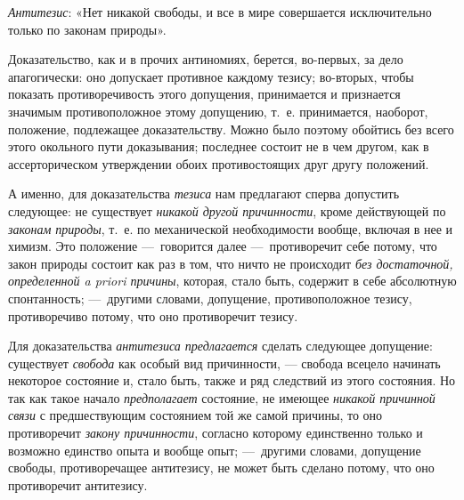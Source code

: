 \documentclass[twoside]{article}
\begin{document}
{{{{{\em Антитезис}: «Нет
никакой свободы, и все в мире совершается исключительно только по законам
природы».

Доказательство, как и в прочих антиномиях, берется, во-первых,
за дело апагогически: оно допускает противное каждому тезису; во-вторых,
чтобы показать противоречивость этого допущения, принимается и признается
значимым противоположное этому допущению, т.~е. принимается, наоборот,
положение, подлежащее доказательству. Можно было поэтому обойтись без всего
этого окольного пути доказывания; последнее состоит не в чем другом, как в
ассерторическом утверждении обоих противостоящих друг другу положений.

А именно, для доказательства
{\em тезиса} нам
предлагают сперва допустить следующее: не существует
{\em никакой другой причинности},
кроме действующей по
{\em законам природы},
т.~е. по механической необходимости вообще, включая в нее и
химизм. Это положение —~говорится далее
—~противоречит себе потому, что закон природы состоит как раз
в том, что ничто не происходит {\em без
достаточной, определенной a priori причины}, которая, стало
быть, содержит в себе абсолютную спонтанность; —~другими
словами, допущение, противоположное тезису, противоречиво потому, что оно
противоречит тезису.

Для доказательства
{\em антитезиса предлагается}
сделать следующее допущение: существует
{\em свобода} как особый
вид причинности, — свобода всецело начинать некоторое
состояние и, стало быть, также и ряд следствий из этого состояния. Но так
как такое начало {\em предполагает}
состояние, не имеющее
{\em никакой причинной связи}
с предшествующим состоянием той же самой причины, то оно
противоречит {\em закону причинности},
согласно которому единственно только и возможно единство
опыта и вообще опыт; —~другими словами, допущение свободы,
противоречащее антитезису, не может быть сделано потому, что оно
противоречит антитезису.

}}}}
\end{document}
